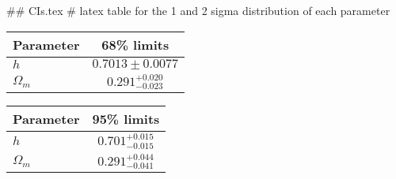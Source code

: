 ## CIs.tex
# latex table for the 1 and 2 sigma distribution of each parameter

\begin{tabular} { l  c}
 Parameter &  68\% limits\\
\hline
{\boldmath$h              $} & $0.7013\pm 0.0077          $\\
{\boldmath$\Omega_m       $} & $0.291^{+0.020}_{-0.023}   $\\
\hline
\end{tabular}

\begin{tabular} { l  c}
 Parameter &  95\% limits\\
\hline
{\boldmath$h              $} & $0.701^{+0.015}_{-0.015}   $\\
{\boldmath$\Omega_m       $} & $0.291^{+0.044}_{-0.041}   $\\
\hline
\end{tabular}
